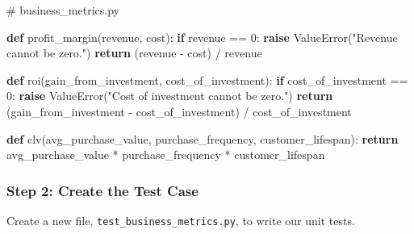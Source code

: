 \documentclass[
  letterpaper,
  DIV=11,
  numbers=noendperiod]{scrreprt}
\newenvironment{Shaded}{\begin{snugshade}}{\end{snugshade}}
\newcommand{\CommentTok}[1]{\textcolor[rgb]{0.37,0.37,0.37}{#1}}
\newcommand{\ControlFlowTok}[1]{\textcolor[rgb]{0.00,0.23,0.31}{\textbf{#1}}}
\newcommand{\DecValTok}[1]{\textcolor[rgb]{0.68,0.00,0.00}{#1}}
\newcommand{\KeywordTok}[1]{\textcolor[rgb]{0.00,0.23,0.31}{\textbf{#1}}}
\newcommand{\NormalTok}[1]{\textcolor[rgb]{0.00,0.23,0.31}{#1}}
\newcommand{\OperatorTok}[1]{\textcolor[rgb]{0.37,0.37,0.37}{#1}}
\newcommand{\PreprocessorTok}[1]{\textcolor[rgb]{0.68,0.00,0.00}{#1}}
\newcommand{\StringTok}[1]{\textcolor[rgb]{0.13,0.47,0.30}{#1}}
\begin{document}
\begin{Shaded}
\begin{Highlighting}[]
\CommentTok{\# business\_metrics.py}

\KeywordTok{def}\NormalTok{ profit\_margin(revenue, cost):}
    \ControlFlowTok{if}\NormalTok{ revenue }\OperatorTok{==} \DecValTok{0}\NormalTok{:}
        \ControlFlowTok{raise} \PreprocessorTok{ValueError}\NormalTok{(}\StringTok{"Revenue cannot be zero."}\NormalTok{)}
    \ControlFlowTok{return}\NormalTok{ (revenue }\OperatorTok{{-}}\NormalTok{ cost) }\OperatorTok{/}\NormalTok{ revenue}

\KeywordTok{def}\NormalTok{ roi(gain\_from\_investment, cost\_of\_investment):}
    \ControlFlowTok{if}\NormalTok{ cost\_of\_investment }\OperatorTok{==} \DecValTok{0}\NormalTok{:}
        \ControlFlowTok{raise} \PreprocessorTok{ValueError}\NormalTok{(}\StringTok{"Cost of investment cannot be zero."}\NormalTok{)}
    \ControlFlowTok{return}\NormalTok{ (gain\_from\_investment }\OperatorTok{{-}}\NormalTok{ cost\_of\_investment) }\OperatorTok{/}\NormalTok{ cost\_of\_investment}

\KeywordTok{def}\NormalTok{ clv(avg\_purchase\_value, purchase\_frequency, customer\_lifespan):}
    \ControlFlowTok{return}\NormalTok{ avg\_purchase\_value }\OperatorTok{*}\NormalTok{ purchase\_frequency }\OperatorTok{*}\NormalTok{ customer\_lifespan}
\end{Highlighting}
\end{Shaded}

\subsubsection{Step 2: Create the Test
Case}\label{step-2-create-the-test-case}

Create a new file, \texttt{test\_business\_metrics.py}, to write our
unit tests.
\end{document}
